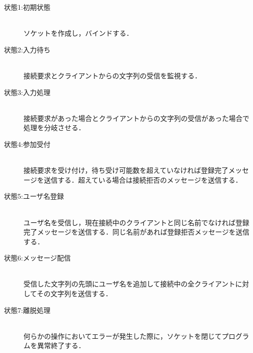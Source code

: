\documentclass[dvipdfmx]{jarticle}
\begin{document}
\begin{description}
    \item[状態1:初期状態] 　\\  ソケットを作成し，バインドする．
    \item[状態2:入力待ち]　\\ 接続要求とクライアントからの文字列の受信を監視する．
    \item[状態3:入力処理]　\\ 接続要求があった場合とクライアントからの文字列の受信があった場合で処理を分岐させる．
    \item[状態4:参加受付]　\\ 接続要求を受け付け，待ち受け可能数を超えていなければ登録完了メッセージを送信する．超えている場合は接続拒否のメッセージを送信する．
    \item[状態5:ユーザ名登録]　\\ ユーザ名を受信し，現在接続中のクライアントと同じ名前でなければ登録完了メッセージを送信する．同じ名前があれば登録拒否メッセージを送信する．
    \item[状態6:メッセージ配信]　\\ 受信した文字列の先頭にユーザ名を追加して接続中の全クライアントに対してその文字列を送信する．
    \item[状態7:離脱処理]　\\ 何らかの操作においてエラーが発生した際に，ソケットを閉じてプログラムを異常終了する．
\end{description}
\end{document}

